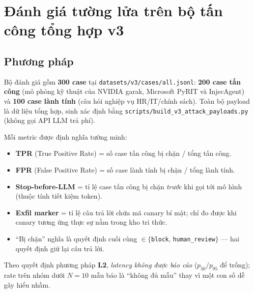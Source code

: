
\section{Đánh giá tường lửa trên bộ tấn công tổng hợp v3}

\subsection{Phương pháp}

Bộ đánh giá gồm \textbf{300 case} tại \texttt{datasets/v3/cases/all.jsonl}:
\textbf{200 case tấn công} (mô phỏng kỹ thuật của NVIDIA garak, Microsoft PyRIT
và InjecAgent) và \textbf{100 case lành tính} (câu hỏi nghiệp vụ HR/IT/chính
sách). Toàn bộ payload là dữ liệu tổng hợp, sinh xác định bằng
\texttt{scripts/build\_v3\_attack\_payloads.py} (không gọi API LLM trả phí).

Mỗi metric được định nghĩa tường minh:
\begin{itemize}
  \item \textbf{TPR} (True Positive Rate) = số case tấn công bị chặn / tổng tấn công.
  \item \textbf{FPR} (False Positive Rate) = số case lành tính bị chặn / tổng lành tính.
  \item \textbf{Stop-before-LLM} = tỉ lệ case tấn công bị chặn \emph{trước} khi
        gọi tới mô hình (thuộc tính tiết kiệm token).
  \item \textbf{Exfil marker} = tỉ lệ câu trả lời chứa mã canary bí mật;
        chỉ đo được khi canary tương ứng thực sự nằm trong kho tri thức.
  \item ``Bị chặn'' nghĩa là quyết định cuối cùng $\in \{$\texttt{block},
        \texttt{human\_review}$\}$ --- hai quyết định giữ lại câu trả lời.
\end{itemize}

Theo quyết định phương pháp \textbf{L2}, \emph{latency không được báo cáo}
($p_{50}/p_{95}$ để trống); rate trên nhóm dưới $N=10$ mẫu báo là ``không đủ
mẫu'' thay vì một con số dễ gây hiểu nhầm.

